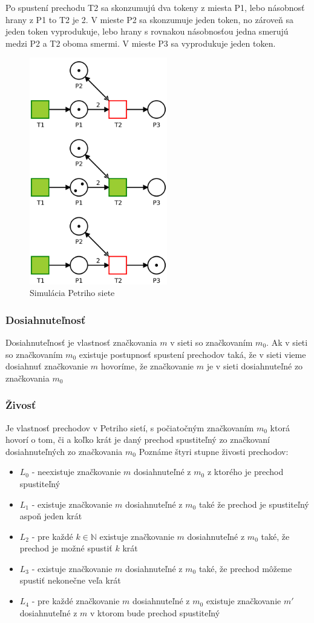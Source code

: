 Po spustení prechodu T2 sa skonzumujú dva tokeny z miesta P1, lebo násobnosť hrany  z P1 to T2 je 2. V mieste P2 sa skonzumuje jeden token, no zároveň sa jeden token vyprodukuje, lebo hrany s rovnakou násobnosťou jedna smerujú medzi P2 a T2 oboma smermi. V mieste P3 sa vyprodukuje jeden token.
\begin{figure}[!htbp]
\centering
\includegraphics[width=6cm]{img/pn_example_run.png}
\caption{Simulácia Petriho siete}
\label{pn_example_run}
\end{figure}

\subsubsection{Dosiahnuteľnosť}
Dosiahnuteľnosť je vlastnosť značkovania $m$ v sieti so značkovaním $m_0$. Ak v sieti so značkovaním $m_0$ existuje postupnosť spustení prechodov taká, že v sieti vieme dosiahnuť značkovanie $m$ hovoríme, že značkovanie $m$ je v sieti dosiahnuteľné zo značkovania $m_0$

\subsubsection{Živosť}
Je vlastnosť prechodov v Petriho sietí, s počiatočným značkovaním $m_0$ ktorá hovorí o tom, či a koľko krát je daný prechod spustiteľný zo značkovaní dosiahnuteľných zo značkovania $m_0$  Poznáme štyri stupne živosti prechodov:
\begin{itemize}
\item $L_0$ - neexistuje značkovanie $m$ dosiahnuteľné z $m_0$ z ktorého je prechod spustiteľný
\item $L_1$ - existuje značkovanie $m$ dosiahnuteľné z $m_0$ také že prechod je spustiteľný aspoň jeden krát
\item $L_2$ - pre každé $k \in \mathbb N$  existuje značkovanie $m$ dosiahnuteľné z $m_0$ také, že prechod je možné spustiť $k$ krát
\item $L_3$ - existuje značkovanie $m$ dosiahnuteľné z $m_0$  také, že prechod môžeme spustiť nekonečne veľa krát
\item $L_4$ - pre každé značkovanie $m$  dosiahnuteľné z $m_0$ existuje značkovanie $m'$ dosiahnuteľné z $m$ v ktorom bude prechod spustiteľný
\end{itemize}

